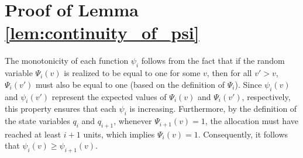 \section{Proof of Lemma \ref{lem:continuity_of_psi}}
\label{apx:lemma-continuitiy}

The monotonicity of each function $\psi_i$ follows from the fact that if the random variable $\Psi_i(v)$ is realized to be equal to one for some $v$, then for all $v' > v$, $\Psi_i(v')$ must also be equal to one (based on the definition of $\Psi_i$). Since $\psi_i(v)$ and $\psi_i(v')$ represent the expected values of $\Psi_i(v)$ and $\Psi_i(v')$, respectively, this property ensures that each $\psi_i$ is increasing. Furthermore, by the definition of the state variables $q_{i}$ and $q_{i+1}$, whenever $\Psi_{i+1}(v) = 1$, the allocation must have reached at least $i+1$ units, which implies $\Psi_i(v) = 1$. Consequently, it follows that $ \psi_{i}(v) \ge \psi_{i+1}(v) $.


